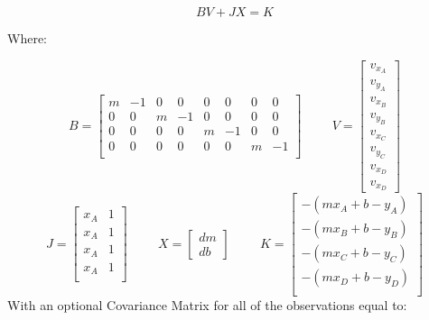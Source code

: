 \[
BV + JX = K
\]

Where:

\[
B = 
\begin{bmatrix}
m &  -1 &  0 &  0 &  0 &  0 &  0 &  0 \\
0 &  0 &  m &  -1 &  0 &  0 &  0 &  0 \\
0 &  0 &  0 &  0 &  m &  -1 &  0 &  0 \\
0 &  0 &  0 &  0 &  0 &  0 &  m &  -1 \\ 
\end{bmatrix}
\hspace{1cm}
V = 
\begin{bmatrix}
v_{x_A} \\ v_{y_A} \\ v_{x_B} \\ v_{y_B} \\ v_{x_C} \\ v_{y_C} \\ v_{x_D} \\ v_{x_D}
\end{bmatrix}
\]
\[
J =
\begin{bmatrix}
x_A & 1 \\
x_A & 1 \\
x_A & 1 \\
x_A & 1 \\
\end{bmatrix}
\hspace{1cm}
X =
\begin{bmatrix}
dm \\ db
\end{bmatrix}
\hspace{1cm}
K = 
\begin{bmatrix}
- (mx_A+b-y_A) \\
- (mx_B+b-y_B) \\
- (mx_C+b-y_C) \\
- (mx_D+b-y_D) \\
\end{bmatrix}
\]
With an optional Covariance Matrix for all of the observations equal to:
